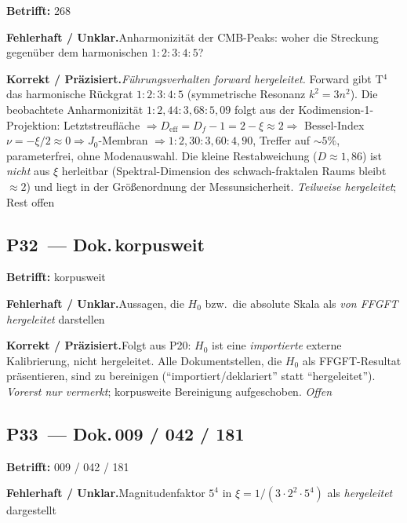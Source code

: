 \noindent\textbf{Betrifft:} 268


\smallskip\noindent\textbf{Fehlerhaft / Unklar.}\quad Anharmonizität der CMB-Peaks: woher die Streckung gegenüber dem harmonischen $1:2:3:4:5$?


\smallskip\noindent\textbf{Korrekt / Präzisiert.}\quad \emph{Führungsverhalten forward hergeleitet.} Forward gibt T$^4$ das harmonische Rückgrat $1:2:3:4:5$ (symmetrische Resonanz $k^2=3n^2$). Die beobachtete Anharmonizität $1:2{,}44:3{,}68:5{,}09$ folgt aus der Kodimension-1-Projektion: Letztstreufläche $\Rightarrow D_\mathrm{eff}=D_f-1=2-\xi\approx2 \Rightarrow$ Bessel-Index $\nu=-\xi/2\approx0 \Rightarrow J_0$-Membran $\Rightarrow 1:2{,}30:3{,}60:4{,}90$, Treffer auf $\sim5\%$, parameterfrei, ohne Modenauswahl. Die kleine Restabweichung ($D\approx1{,}86$) ist \emph{nicht} aus $\xi$ herleitbar (Spektral-Dimension des schwach-fraktalen Raums bleibt $\approx2$) und liegt in der Größenordnung der Messunsicherheit. \emph{Teilweise hergeleitet}; Rest offen


\medskip


\subsection*{P32~--- Dok.\,korpusweit}

\noindent\textbf{Betrifft:} korpusweit


\smallskip\noindent\textbf{Fehlerhaft / Unklar.}\quad Aussagen, die $H_0$ bzw.\ die absolute Skala als \emph{von FFGFT hergeleitet} darstellen


\smallskip\noindent\textbf{Korrekt / Präzisiert.}\quad Folgt aus P20: $H_0$ ist eine \emph{importierte} externe Kalibrierung, nicht hergeleitet. Alle Dokumentstellen, die $H_0$ als FFGFT-Resultat präsentieren, sind zu bereinigen (\enquote{importiert/deklariert} statt \enquote{hergeleitet}). \emph{Vorerst nur vermerkt}; korpusweite Bereinigung aufgeschoben. \emph{Offen}


\medskip


\subsection*{P33~--- Dok.\,009 / 042 / 181}

\noindent\textbf{Betrifft:} 009 / 042 / 181


\smallskip\noindent\textbf{Fehlerhaft / Unklar.}\quad Magnitudenfaktor $5^4$ in $\xi = 1/(3\cdot2^2\cdot5^4)$ als \emph{hergeleitet} dargestellt


